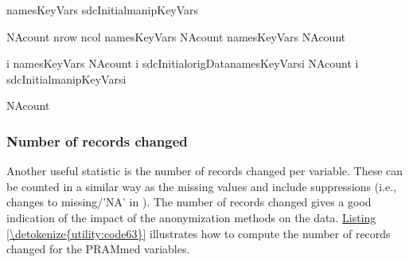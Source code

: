 \documentclass[letterpaper,10pt,english]{sphinxmanual}
\begin{document}
\def\sphinxLiteralBlockLabel{\label{\detokenize{utility:code62}}}
%
\begin{sphinxVerbatim}[commandchars=\\\{\},numbers=left,firstnumber=1,stepnumber=1]
namesKeyVars  sdcInitialmanipKeyVars

NAcount   nrow   ncol  namesKeyVars
NAcount   namesKeyVars 
NAcount    

i  namesKeyVars 
  NAcount\PYG{p}{[} i\PYG{p}{]}  sdcInitialorigData\PYG{p}{[}namesKeyVars\PYG{p}{[}i\PYG{p}{]]}
  NAcount\PYG{p}{[} i\PYG{p}{]}  sdcInitialmanipKeyVars\PYG{p}{[}i\PYG{p}{]}

NAcount
\end{sphinxVerbatim}


\subsubsection{Number of records changed}
\label{\detokenize{utility:number-of-records-changed}}
Another useful statistic is the number of records changed per variable.
These can be counted in a similar way as the missing values and include
suppressions (i.e., changes to missing/’NA’ in ). The number of
records changed gives a good indication of the impact of the
anonymization methods on the data. \hyperref[\detokenize{utility:code63}]{Listing \ref{\detokenize{utility:code63}}} illustrates how to
compute the number of records changed for the PRAMmed variables.
\end{document}
